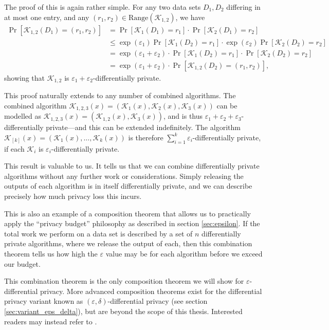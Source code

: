 \documentclass[12pt]{article}
\newcommand{\fancy}{\mathcal}
\renewcommand{\epsilon}{\varepsilon}
\begin{document}
The proof of this is again rather simple. For any two data sets $D_1,D_2$ differing in at most one entry, and any $(r_1,r_2) \in \text{Range}(\fancy{K}_{1,2})$, we have
\begin{align*}
    \Pr[\fancy{K}_{1,2}(D_1)=(r_1,r_2)] &= \Pr[\fancy{K}_1(D_1)=r_1]\cdot\Pr[\fancy{K}_2(D_1)=r_2] \\
        &\leq \exp(\epsilon_1) \Pr[\fancy{K}_1(D_2)=r_1] \cdot \exp(\epsilon_2) \Pr[\fancy{K}_2(D_2)=r_2] \\
        &= \exp(\epsilon_1 + \epsilon_2) \cdot \Pr[\fancy{K}_1(D_2)=r_1] \cdot \Pr[\fancy{K}_2(D_2)=r_2] \\
        &= \exp(\epsilon_1 + \epsilon_2) \cdot \Pr[\fancy{K}_{1,2}(D_2)=(r_1,r_2)],
\end{align*}
showing that $\fancy{K}_{1,2}$ is $\epsilon_1+\epsilon_2$-differentially private.

This proof naturally extends to any number of combined algorithms. The combined algorithm $\fancy{K}_{1,2,3}(x)=\left(\fancy{K}_1(x), \fancy{K}_2(x), \fancy{K}_3(x) \right)$ can be modelled as $\fancy{K}_{1,2,3}(x)=\left(\fancy{K}_{1,2}(x), \fancy{K}_3(x)\right)$, and is thus $\epsilon_1 + \epsilon_2 + \epsilon_3$-differentially private---and this can be extended indefinitely. The algorithm $\fancy{K}_{[k]}(x)=\left(\fancy{K}_1(x), \dots, \fancy{K}_k(x) \right)$ is therefore $\sum_{i=1}^k \epsilon_i$-differentially private, if each $\fancy{K}_i$ is $\epsilon_i$-differentially private. \bigskip

This result is valuable to us. It tells us that we can combine differentially private algorithms without any further work or considerations. Simply releasing the outputs of each algorithm is in itself differentially private, and we can describe precisely how much privacy loss this incurs.

This is also an example of a composition theorem that allows us to practically apply the ``privacy budget'' philosophy as described in section \ref{sec:epsilon}. If the total work we perform on a data set is described by a set of $n$ differentially private algorithms, where we release the output of each, then this combination theorem tells us how high the $\epsilon$ value may be for each algorithm before we exceed our budget. \bigskip

This combination theorem is the only composition theorem we will show for $\epsilon$-differential privacy. More advanced composition theorems exist for the differential privacy variant known as $(\epsilon,\delta)$-differential privacy (see section \ref{sec:variant_eps_delta}), but are beyond the scope of this thesis. Interested readers may instead refer to \cite[ch.~3]{dwork_privacybook}.
\end{document}
